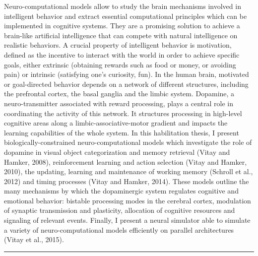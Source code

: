 \documentclass[
  11pt,
  a4paper,
]{scrbook}
\begin{document}

Neuro-computational models allow to study the brain mechanisms involved
in intelligent behavior and extract essential computational principles
which can be implemented in cognitive systems. They are a promising
solution to achieve a brain-like artificial intelligence that can
compete with natural intelligence on realistic behaviors. A crucial
property of intelligent behavior is motivation, defined as the incentive
to interact with the world in order to achieve specific goals, either
extrinsic (obtaining rewards such as food or money, or avoiding pain) or
intrinsic (satisfying one's curiosity, fun). In the human brain,
motivated or goal-directed behavior depends on a network of different
structures, including the prefrontal cortex, the basal ganglia and the
limbic system. Dopamine, a neuro-transmitter associated with reward
processing, plays a central role in coordinating the activity of this
network. It structures processing in high-level cognitive areas along a
limbic-associative-motor gradient and impacts the learning capabilities
of the whole system. In this habilitation thesis, I present
biologically-constrained neuro-computational models which investigate
the role of dopamine in visual object categorization and memory
retrieval (Vitay and Hamker, 2008), reinforcement learning and action
selection (Vitay and Hamker, 2010), the updating, learning and
maintenance of working memory (Schroll et al., 2012) and timing
processes (Vitay and Hamker, 2014). These models outline the many
mechanisms by which the dopaminergic system regulates cognitive and
emotional behavior: bistable processing modes in the cerebral cortex,
modulation of synaptic transmission and plasticity, allocation of
cognitive resources and signaling of relevant events. Finally, I present
a neural simulator able to simulate a variety of neuro-computational
models efficiently on parallel architectures (Vitay et al., 2015).

\begin{center}\rule{0.5\linewidth}{0.5pt}\end{center}

\newpage
\end{document}
